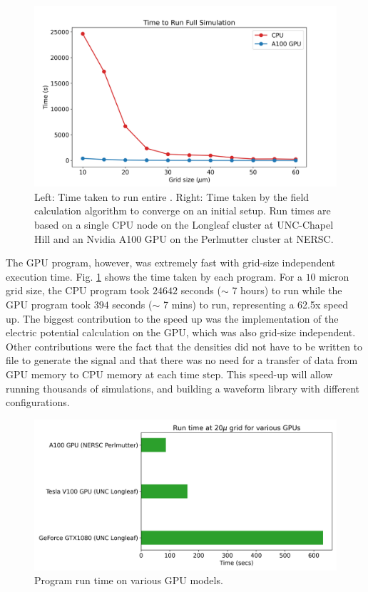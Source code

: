 \begin{figure}[!ht]
\centering
 \includegraphics[width=0.99\linewidth]{ch4/figs/cpu_gpu_comp.png}
\caption{\label{fig:GPU_time} Left: Time taken to run entire {\tdsim}. Right: Time taken by the field calculation algorithm to converge on an initial setup. Run times are based on a single CPU node on the Longleaf cluster at UNC-Chapel Hill and an Nvidia A100 GPU on the Perlmutter cluster at NERSC.}
\end{figure}


The GPU program, however, was extremely fast with grid-size independent execution time. Fig. \ref{fig:GPU_time} shows the time taken by each program. For a $10$ micron grid size, the CPU program took $24642$ seconds ($\sim$ 7 hours) to run while the GPU program took $394$ seconds ($\sim$ 7 mins) to run, representing a 62.5x speed up. The biggest contribution to the speed up was the implementation of the electric potential calculation on the GPU, which was also grid-size independent. Other contributions were the fact that the densities did not have to be written to file to generate the signal and that there was no need for a transfer of data from GPU memory to CPU memory at each time step. This speed-up will allow running thousands of simulations, and building a waveform library with different configurations.


 \begin{figure}
    \centering
    \includegraphics[width=0.99\linewidth]{ch4/figs/gpu_comp.png}
\caption{\label{ch4:fig:GPU_comp} Program run time on various GPU models.}
\end{figure}

